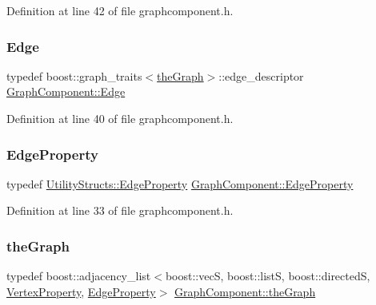 Definition at line 42 of file graphcomponent.\+h.

\mbox{\label{class_graph_component_aa7517b2af08aa717324076a645c73fe6}} 
\subsubsection{\texorpdfstring{Edge}{Edge}}
{\footnotesize\ttfamily typedef boost\+::graph\+\_\+traits$<$\hyperlink{class_graph_component_a982e0748a6e1b8dc74986f5f8b3dca5c}{the\+Graph}$>$\+::edge\+\_\+descriptor \hyperlink{class_graph_component_aa7517b2af08aa717324076a645c73fe6}{Graph\+Component\+::\+Edge}}



Definition at line 40 of file graphcomponent.\+h.

\mbox{\label{class_graph_component_ae2f6ef4a3ac656d8213df42aa3d4c3b3}} 
\subsubsection{\texorpdfstring{Edge\+Property}{EdgeProperty}}
{\footnotesize\ttfamily typedef \hyperlink{struct_utility_structs_1_1_edge_property}{Utility\+Structs\+::\+Edge\+Property} \hyperlink{class_graph_component_ae2f6ef4a3ac656d8213df42aa3d4c3b3}{Graph\+Component\+::\+Edge\+Property}}



Definition at line 33 of file graphcomponent.\+h.

\mbox{\label{class_graph_component_a982e0748a6e1b8dc74986f5f8b3dca5c}} 
\subsubsection{\texorpdfstring{the\+Graph}{theGraph}}
{\footnotesize\ttfamily typedef boost\+::adjacency\+\_\+list$<$boost\+::vecS, boost\+::listS, boost\+::directedS, \hyperlink{class_graph_component_a7c0fcb3f03bf188b7df520e0cdd364b7}{Vertex\+Property}, \hyperlink{class_graph_component_ae2f6ef4a3ac656d8213df42aa3d4c3b3}{Edge\+Property}$>$ \hyperlink{class_graph_component_a982e0748a6e1b8dc74986f5f8b3dca5c}{Graph\+Component\+::the\+Graph}}



